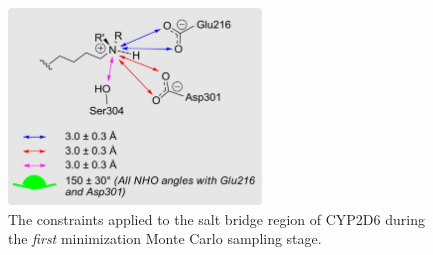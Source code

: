 \begin{figure}[hp]
\centering
\includegraphics[width=0.6\textwidth]{figures/idsite/salt_bridge_first}
\caption{The constraints applied to the salt bridge region of CYP2D6 during the {\it first} minimization Monte Carlo sampling stage.}
\label{figure:salt_bridge_first}
\end{figure}
